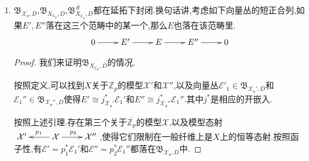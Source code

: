 \begin{enumerate}
\begin{proof}
    	可选取有限扩张$K/\mathbb{Q}_p$,使得所有东西都下降到$K$上.考虑如下态射的复合:
    	$$\xymatrix{X\ar[r]^{\Delta}&X\times_KX\ar[r]&\mathcal{X}_1\times_{\mathscr{o}_K}\mathcal{X}_2}$$
    	
    	由于$X$是既约的,这个复合态射的概形像就是它像集的闭包上赋予既约闭子概型结构.把这个概形像记作$\widetilde{\mathcal{X}_3}$,由于$K$是平坦$\mathscr{o}_K$模,平坦基变换是保概形像的,于是$\widetilde{\mathcal{X}_3}\times_{\mathscr{o}_K}K$是$X\to X\times_KX$的概形像,但是$X$是可分$K$概形,这个概形像同构于$X$本身,综上我们证明了$\widetilde{\mathcal{X}_3}$的一般纤维仍然同构于$X$.进而$\widetilde{\mathcal{X}_3}\to\mathcal{X}_1\times_{\mathscr{o}_K}\mathcal{X}_2\to\mathcal{X}_1$的一般纤维态射同构于$X$上的恒等态射.
    	$$\xymatrix{X\ar[r]\ar[dr]&X\times_KX\ar@{=}[r]&X\times_KX\ar[r]&X\\&\widetilde{\mathcal{X}_3}\times_{\mathscr{o}_K}K\ar[ur]&&}$$
    	
    	
    	
    \end{proof}
    \item $\mathfrak{B}_{\mathcal{X}_{\mathfrak{o}},D}$,$\mathfrak{B}_{X_{\mathbb{C}_p},D}$,$\mathfrak{B}_{X_{\mathbb{C}_p},D}^{\#}$都在延拓下封闭.换句话讲,考虑如下向量丛的短正合列,如果$E',E''$落在这三个范畴中的某一个,那么$E$也落在该范畴里.
    $$\xymatrix{0\ar[r]&E'\ar[r]&E\ar[r]&E''\ar[r]&0}$$
    \begin{proof}
    	
    	我们来证明$\mathfrak{B}_{X_{\mathbb{C}_p},D}$的情况.
    	
    	\qquad
    	
    	按照定义,可以找到$X$关于$\overline{\mathbb{Z}_p}$的模型$\mathcal{X}'$和$\mathcal{X}''$,以及向量丛$\mathcal{E}'_1\in\mathfrak{B}_{\mathcal{X}_{\mathfrak{o}}',D}$和$\mathcal{E}_1''\in\mathfrak{B}_{\mathcal{X}_{\mathfrak{o}}'',D}$使得$E'\cong j^*_{\mathcal{X}_{\mathfrak{o}}'}\mathcal{E}_1'$和$E''\cong j^*_{\mathcal{X}_{\mathfrak{o}}''}\mathcal{E}_1''$.其中$j^*$是相应的开嵌入.
    	
    	\qquad
    	
    	按照上述引理.存在第三个关于$\overline{\mathbb{Z}_p}$的模型$\mathcal{X}$,以及模型态射$\xymatrix{\mathcal{X}'&\mathcal{X}\ar[l]_{p_1}\ar[r]^{p_2}&\mathcal{X}''}$,使得它们限制在一般纤维上是$X$上的恒等态射.按照函子性,有$\mathcal{E}'=p_1^*\mathcal{E}_1'$和$\mathcal{E}''=p_2^*\mathcal{E}_1''$都落在$\mathfrak{B}_{\mathcal{X}_{\mathfrak{o}},D}$中.
    	
    	\qquad
    	

\end{proof}
\end{enumerate}

